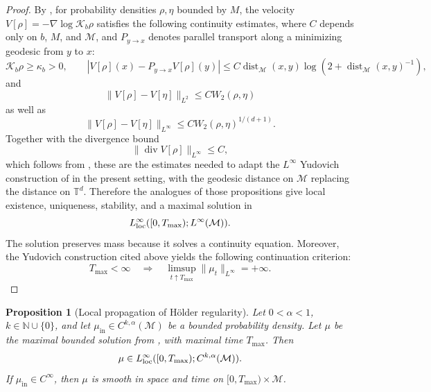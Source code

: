 \documentclass[11pt]{article}
\newtheorem{proposition}[theorem]{Proposition}
\theoremstyle{definition}
\newcommand{\Torus}{\mathbb{T}}
\newcommand{\divg}{\operatorname{div}}
\def\M{\mathcal M}
\begin{document}
\begin{proof}
By
,
for probability densities \(\rho,\eta\) bounded by \(M\), the velocity
\(V[\rho]=-\nabla\log \mathcal K_b\rho\) satisfies the following continuity estimates,
where \(C\) depends only on \(b\), \(M\), and  \(\M\), and $P_{y\to x}$ denotes parallel transport along a minimizing geodesic from $y$ to $x$:
\[
\mathcal K_b\rho\ge \kappa_b>0,\qquad
|V[\rho](x)-P_{y\to x}V[\rho](y)|
\le C\operatorname{dist}_{ \M}(x,y)
\log\!\left(2+\operatorname{dist}_{ \M}(x,y)^{-1}\right),
\]
and
\[
\|V[\rho]-V[\eta]\|_{L^2}
\le CW_2(\rho,\eta)
\]
as well as
\[
\|V[\rho]-V[\eta]\|_{L^\infty}
\le CW_2(\rho,\eta)^{ 1/(d+1)}.
\]
Together with the divergence bound
\[
\|\divg V[\rho]\|_{L^\infty}\le C,
\]
which follows from , these are the estimates needed to adapt the
\(L^\infty\) Yudovich construction of
\cite[Propositions~2.8--2.9]{chizat2026quantitative_kmd} in
the present setting, with the geodesic distance on  \(\M\) replacing
the distance on \(\Torus^d\).
Therefore the analogues of those propositions give local existence,
uniqueness, stability, and a maximal solution in
\[
L^\infty_{\rm loc}([0,T_{\max});L^\infty( \M)).
\]
The solution preserves mass because it solves a continuity equation.  Moreover, the Yudovich construction cited above yields the following continuation criterion:
\[
T_{\max}<\infty
\quad\Longrightarrow\quad
\limsup_{t\uparrow T_{\max}}\|\mu_t\|_{L^\infty}=+\infty .
\]
\end{proof}

\begin{proposition}[Local propagation of Hölder regularity]\label{prop:pde_holder_propagation}
Let \(0<\alpha<1\), \(k\in\mathbb N\cup\{0\}\), and let
    \(\mu_{\mathrm{in}}\in C^{k,\alpha}( \M)\) be a bounded probability density.
Let \(\mu\) be the maximal bounded solution from
, with maximal time
\(T_{\max}\).  Then
\[
\mu\in L^\infty_{\rm loc}([0,T_{\max});C^{k,\alpha}( \M)).
\]
If \(\mu_{\mathrm{in}}\in C^\infty\), then \(\mu\) is smooth in space and time on
\([0,T_{\max})\times \M\).
\end{proposition}
\end{document}
